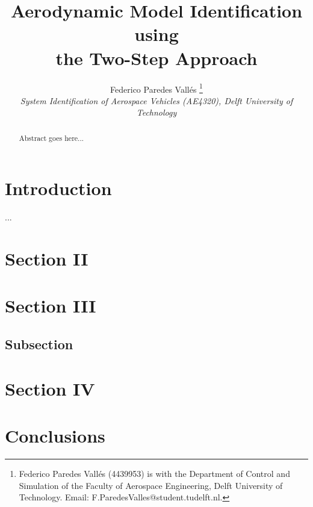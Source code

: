 \documentclass[]{aiaa-tc}%
\title{Aerodynamic Model Identification using \\the Two-Step Approach}
\author{
  Federico Paredes Vall\'es%
    \thanks{Federico Paredes Vall\'es (4439953) is with the Department of Control and Simulation of the Faculty of Aerospace Engineering, Delft University of Technology. Email: F.ParedesValles@student.tudelft.nl.}\\
  {\normalsize\itshape
   System Identification of Aerospace Vehicles (AE4320), Delft University of Technology}\\
  {\normalsize\itshape }
 }
\begin{document}
\maketitle

\begin{abstract}
Abstract goes here...
\vspace{40pt}
\end{abstract}


\section{Introduction}

...

\section{Section II}

\section{Section III}

\subsection{Subsection}

\section{Section IV}

\section{Conclusions}
\end{document}
